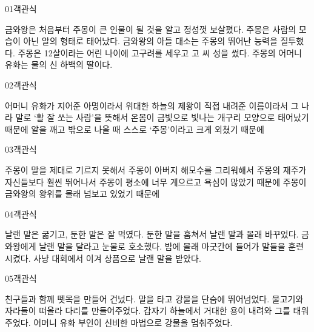 \documentclass[fs9,seriesFre]{korfarm-base}
\begin{document}
\par\medskip
\kfBeginMC
\begin{kfQBlock}{01}{객관식}
\begin{kfChoices}
\kfChoice 금와왕은 처음부터 주몽이 큰 인물이 될 것을 알고 정성껏 보살폈다.
\kfChoice 주몽은 사람의 모습이 아닌 알의 형태로 태어났다.
\kfChoice 금와왕의 아들 대소는 주몽의 뛰어난 능력을 질투했다.
\kfChoice 주몽은 12살이라는 어린 나이에 고구려를 세우고 고 씨 성을 썼다.
\kfChoice 주몽의 어머니 유화는 물의 신 하백의 딸이다.
\end{kfChoices}
\end{kfQBlock}
\begin{kfQBlock}{02}{객관식}
\begin{kfChoices}
\kfChoice 어머니 유화가 지어준 아명이라서
\kfChoice 위대한 하늘의 제왕이 직접 내려준 이름이라서
\kfChoice 그 나라 말로 ‘활 잘 쏘는 사람’을 뜻해서
\kfChoice 온몸이 금빛으로 빛나는 개구리 모양으로 태어났기 때문에
\kfChoice 알을 깨고 밖으로 나올 때 스스로 ‘주몽’이라고 크게 외쳤기 때문에
\end{kfChoices}
\end{kfQBlock}
\begin{kfQBlock}{03}{객관식}
\begin{kfChoices}
\kfChoice 주몽이 말을 제대로 기르지 못해서
\kfChoice 주몽이 아버지 해모수를 그리워해서
\kfChoice 주몽의 재주가 자신들보다 훨씬 뛰어나서
\kfChoice 주몽이 평소에 너무 게으르고 욕심이 많았기 때문에
\kfChoice 주몽이 금와왕의 왕위를 몰래 넘보고 있었기 때문에
\end{kfChoices}
\end{kfQBlock}
\begin{kfQBlock}{04}{객관식}
\begin{kfChoices}
\kfChoice 날랜 말은 굶기고, 둔한 말은 잘 먹였다.
\kfChoice 둔한 말을 훔쳐서 날랜 말과 몰래 바꾸었다.
\kfChoice 금와왕에게 날랜 말을 달라고 눈물로 호소했다.
\kfChoice 밤에 몰래 마굿간에 들어가 말들을 훈련시켰다.
\kfChoice 사냥 대회에서 이겨 상품으로 날랜 말을 받았다.
\end{kfChoices}
\end{kfQBlock}
\begin{kfQBlock}{05}{객관식}
\begin{kfChoices}
\kfChoice 친구들과 함께 뗏목을 만들어 건넜다.
\kfChoice 말을 타고 강물을 단숨에 뛰어넘었다.
\kfChoice 물고기와 자라들이 떠올라 다리를 만들어주었다.
\kfChoice 갑자기 하늘에서 거대한 용이 내려와 그를 태워주었다.
\kfChoice 어머니 유화 부인이 신비한 마법으로 강물을 멈춰주었다.
\end{kfChoices}
\end{kfQBlock}
\end{document}
